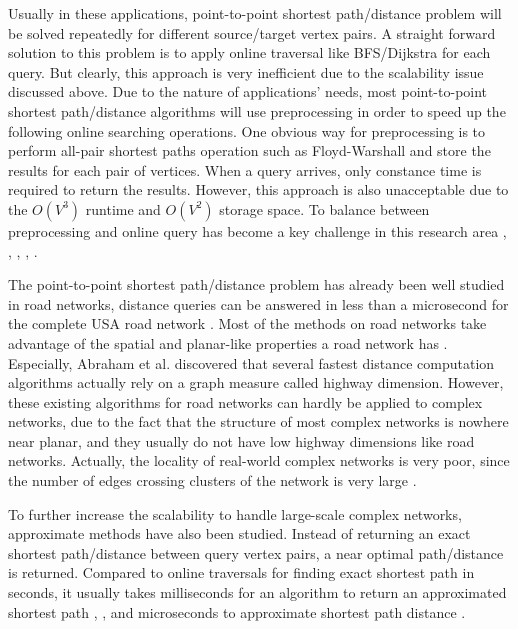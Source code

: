 Usually in these applications, point-to-point shortest path/distance problem will be solved repeatedly for different source/target vertex pairs. A straight forward solution to this problem is to apply online traversal like BFS/Dijkstra for each query. But clearly, this approach is very inefficient due to the scalability issue discussed above. Due to the nature of applications' needs, most point-to-point shortest path/distance algorithms will use preprocessing in order to speed up the following online searching operations. One obvious way for preprocessing is to perform all-pair shortest paths operation such as Floyd-Warshall and store the results for each pair of vertices. When a query arrives, only constance time is required to return the results. However, this approach is also unacceptable due to the $O(V^3)$ runtime and $O(V^2)$ storage space. To balance between preprocessing and online query has become a key challenge in this research area \cite{Potamias:2009:FSP:1645953.1646063}, \cite{tretyakov2011fast}, \cite{Akiba:2012:SQC:2247596.2247614}, \cite{6399472}, \cite{Jin:2012:HLA:2213836.2213887}.

The point-to-point shortest path/distance problem has already been well studied in road networks, distance queries can be answered in less than a microsecond for the complete USA road network \cite{Abraham:2011:HLA:2008623.2008645}. Most of the methods on road networks take advantage of the spatial and planar-like properties a road network has \cite{Gubichev:2010:FAE:1871437.1871503}. Especially, Abraham et al. discovered that several fastest distance computation algorithms actually rely on a graph measure called highway dimension. However, these existing algorithms for road networks can hardly be applied to complex networks, due to the fact that the structure of most complex networks is nowhere near planar, and they usually do not have low highway dimensions like road networks. Actually, the locality of real-world complex networks is very poor, since the number of edges crossing clusters of the network is very large \cite{Leskovec08communitystructure}.

To further increase the scalability to handle large-scale complex networks, approximate methods have also been studied. Instead of returning an exact shortest path/distance between query vertex pairs, a near optimal path/distance is returned. Compared to online traversals for finding exact shortest path in seconds, it usually takes milliseconds for an algorithm to return an approximated shortest path \cite{Gubichev:2010:FAE:1871437.1871503}, \cite{tretyakov2011fast}, and microseconds to approximate shortest path distance \cite{Akiba:2013:FES:2463676.2465315}.

